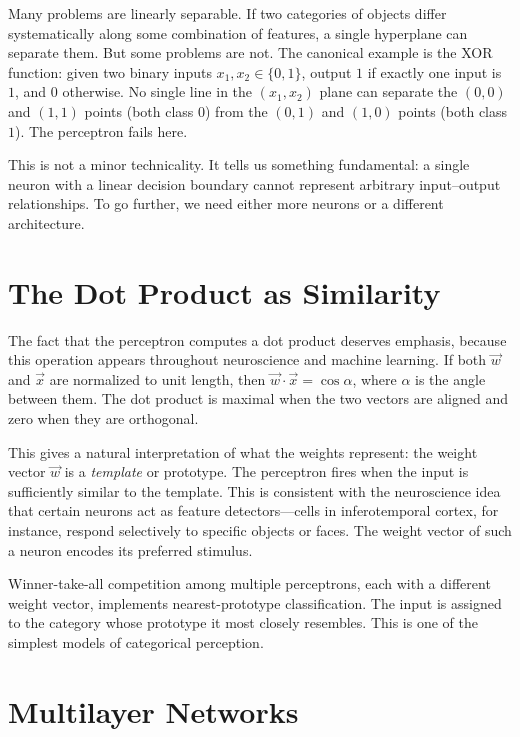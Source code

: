 Many problems are linearly separable. If two categories of objects differ systematically along some combination of features, a single hyperplane can separate them. But some problems are not. The canonical example is the XOR function: given two binary inputs $x_1, x_2 \in \{0, 1\}$, output $1$ if exactly one input is $1$, and $0$ otherwise. No single line in the $(x_1, x_2)$ plane can separate the $(0,0)$ and $(1,1)$ points (both class $0$) from the $(0,1)$ and $(1,0)$ points (both class $1$). The perceptron fails here.

This is not a minor technicality. It tells us something fundamental: a single neuron with a linear decision boundary cannot represent arbitrary input--output relationships. To go further, we need either more neurons or a different architecture.

\section{The Dot Product as Similarity}
\label{sec:dot-product}

The fact that the perceptron computes a dot product deserves emphasis, because this operation appears throughout neuroscience and machine learning. If both $\vec{w}$ and $\vec{x}$ are normalized to unit length, then $\vec{w} \cdot \vec{x} = \cos\alpha$, where $\alpha$ is the angle between them. The dot product is maximal when the two vectors are aligned and zero when they are orthogonal.

This gives a natural interpretation of what the weights represent: the weight vector $\vec{w}$ is a \emph{template} or prototype. The perceptron fires when the input is sufficiently similar to the template. This is consistent with the neuroscience idea that certain neurons act as feature detectors---cells in inferotemporal cortex, for instance, respond selectively to specific objects or faces. The weight vector of such a neuron encodes its preferred stimulus.

Winner-take-all competition among multiple perceptrons, each with a different weight vector, implements nearest-prototype classification. The input is assigned to the category whose prototype it most closely resembles. This is one of the simplest models of categorical perception.

\section{Multilayer Networks}
\label{sec:multilayer}

